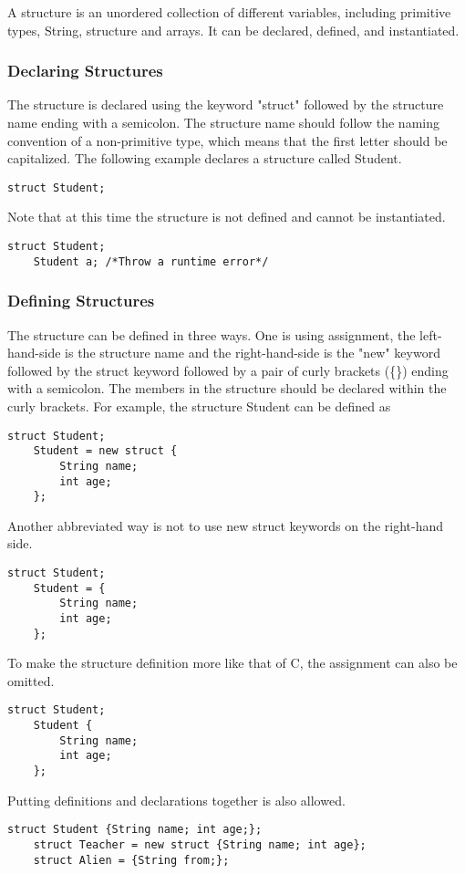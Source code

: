 A structure is an unordered collection of different variables, including primitive types, String, structure and arrays. It can be declared, defined, and instantiated.
\subsubsection{Declaring Structures}
The structure is declared using the keyword "struct" followed by the structure name ending with a semicolon. The structure name should follow the naming convention of a non-primitive type, which means that the first letter should be capitalized. The following example declares a structure called Student.
\begin{lstlisting}[caption={struct\_declaration.csm}, captionpos=b]
    struct Student;
\end{lstlisting}
Note that at this time the structure is not defined and cannot be instantiated.
\begin{lstlisting}[caption={struct\_not\_defined.csm}, captionpos=b]
    struct Student;
    Student a; /*Throw a runtime error*/
\end{lstlisting}
\subsubsection{Defining Structures}
The structure can be defined in three ways. One is using assignment, the left-hand-side is the structure name and the right-hand-side is the "new" keyword followed by the struct keyword followed by a pair of curly brackets (\{\}) ending with a semicolon. The members in the structure should be declared within the curly brackets. For example, the structure Student can be defined as
\begin{lstlisting}[caption={struct\_definition.csm}, captionpos=b]
    struct Student;
    Student = new struct {
        String name;
        int age;
    };
\end{lstlisting}
Another abbreviated way is not to use new struct keywords on the right-hand side.
\begin{lstlisting}[caption={struct\_definition.csm}, captionpos=b]
    struct Student;
    Student = {
        String name;
        int age;
    };
\end{lstlisting}
To make the structure definition more like that of C, the assignment can also be omitted.
\begin{lstlisting}[caption={struct\_definition.csm}, captionpos=b]
    struct Student;
    Student {
        String name;
        int age;
    };
\end{lstlisting}
Putting definitions and declarations together is also allowed.
\begin{lstlisting}[caption={struct\_definition.csm}, captionpos=b]
    struct Student {String name; int age;};
    struct Teacher = new struct {String name; int age};
    struct Alien = {String from;};
\end{lstlisting}

